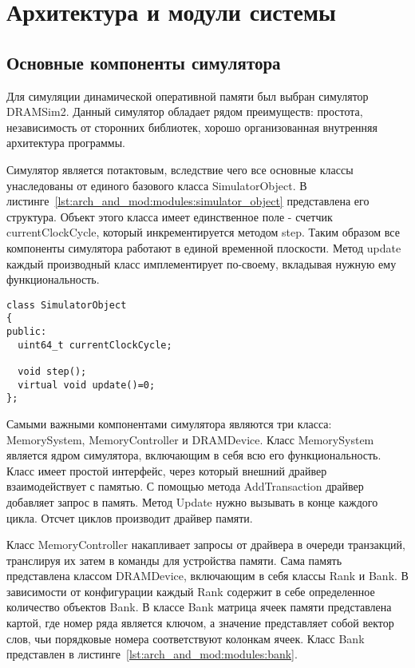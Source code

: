 \section{Архитектура и модули системы} %
\label{sec:arch_and_mod}

\subsection{Основные компоненты симулятора}
\label{sub:arch_and_mod:modules}

Для симуляции динамической оперативной памяти был выбран симулятор DRAMSim2. Данный симулятор обладает рядом преимуществ: простота, независимость от сторонних библиотек, хорошо организованная внутренняя архитектура программы. 

Симулятор является потактовым, вследствие чего все основные классы унаследованы от единого базового класса SimulatorObject. В листинге~\ref{lst:arch_and_mod:modules:simulator_object} представлена его структура. Объект этого класса имеет единственное поле - счетчик currentClockCycle, который инкрементируется методом step. Таким образом все компоненты симулятора работают в единой временной плоскости. Метод update каждый производный класс имплементирует по-своему, вкладывая нужную ему функциональность.  

\begin{lstlisting}[style=cplusplusstyle, caption={Класс SimulatorObject}, label=lst:arch_and_mod:modules:simulator_object]
class SimulatorObject
{
public:
  uint64_t currentClockCycle;

  void step();
  virtual void update()=0;
};
\end{lstlisting}

Самыми важными компонентами симулятора являются три класса: MemorySystem, MemoryController и DRAMDevice. 
Класс MemorySystem является ядром симулятора, включающим в себя всю его функциональность. Класс имеет простой интерфейс, через который внешний драйвер взаимодействует с памятью. С помощью метода AddTransaction драйвер добавляет запрос в память. Метод Update нужно вызывать в конце каждого цикла. Отсчет циклов производит драйвер памяти. 

Класс MemoryController  накапливает запросы от драйвера в очереди транзакций, транслируя их затем в команды для устройства памяти.  
Сама память представлена классом DRAMDevice, включающим в себя классы Rank и Bank. В зависимости от конфигурации каждый Rank содержит в себе определенное количество объектов Bank. В классе Bank матрица ячеек памяти представлена картой, где номер ряда является ключом, а значение представляет собой вектор слов, чьи порядковые номера соответствуют колонкам ячеек. Класс Bank представлен в листинге~\ref{lst:arch_and_mod:modules:bank}.

